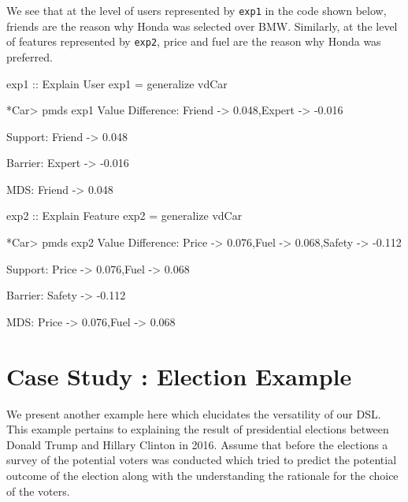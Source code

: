 \documentclass{jfp}
\newcommand{\prog}[1]{\texttt{#1}}
\begin{document}

We see that at the level of users represented by \prog{exp1} in the code shown below, friends are the reason why Honda was selected over BMW. Similarly, at the level of features represented by \prog{exp2}, price and fuel are the reason why Honda was preferred. 
\begin{haskellcode}
exp1 :: Explain User
exp1 = generalize vdCar

*Car> pmds exp1
Value Difference: {Friend -> 0.048,Expert -> -0.016}

Support: {Friend -> 0.048}

Barrier: {Expert -> -0.016}

MDS: {Friend -> 0.048}

exp2 :: Explain Feature
exp2 = generalize vdCar

*Car> pmds exp2
Value Difference: {Price -> 0.076,Fuel -> 0.068,Safety -> -0.112}

Support: {Price -> 0.076,Fuel -> 0.068}

Barrier: {Safety -> -0.112}

MDS: {Price -> 0.076,Fuel -> 0.068}
\end{haskellcode}

\section{Case Study : Election Example}
We present another example here which elucidates the versatility of our DSL. This example pertains to explaining the result of presidential elections between Donald Trump and Hillary Clinton in 2016. Assume that before the elections a survey of the potential voters was conducted which tried to predict the potential outcome of the election along with the understanding the rationale for the choice of the voters. 
\end{document}
